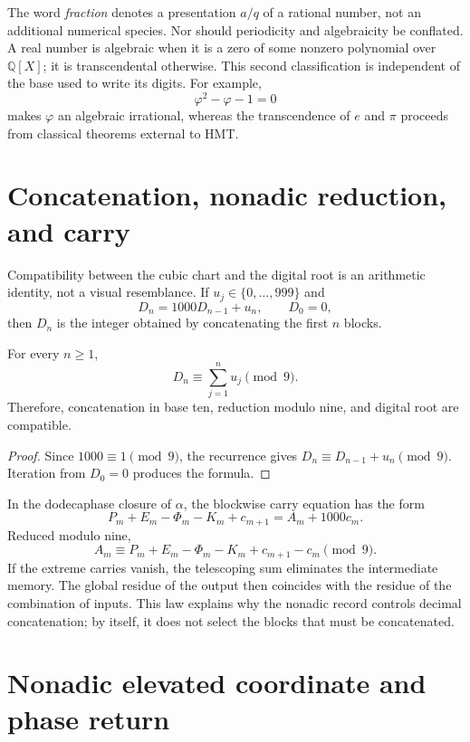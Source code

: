 The word \emph{fraction} denotes a presentation \(a/q\) of a rational
number, not an additional numerical species. Nor should periodicity and
algebraicity be conflated. A real number is algebraic when it is a zero of
some nonzero polynomial over \(\mathbb Q[X]\); it is transcendental otherwise. This
second classification is independent of the base used to write its digits.
For example,
\[
 \varphi^2-\varphi-1=0
\]
makes \(\varphi\) an algebraic irrational, whereas the transcendence
of \(e\) and \(\pi\) proceeds from classical theorems external to HMT\@.

\section{Concatenation, nonadic reduction, and carry}

Compatibility between the cubic chart and the digital root is an arithmetic
identity, not a visual resemblance. If \(u_j\in\{0,\ldots,999\}\) and
\[
 D_n=1000D_{n-1}+u_n,
 \qquad D_0=0,
\]
then \(D_n\) is the integer obtained by concatenating the first \(n\)
blocks.

\begin{theorem}
\label{thm:checksum-nonadico-base-mil}
For every \(n\geq1\),
\[
 D_n\equiv\sum_{j=1}^n u_j\pmod9.
\]
Therefore, concatenation in base ten, reduction modulo nine, and digital root are compatible.
\end{theorem}

\begin{proof}
Since \(1000\equiv1\pmod9\), the recurrence gives
\(D_n\equiv D_{n-1}+u_n\pmod9\). Iteration from \(D_0=0\) produces the
formula.
\end{proof}

In the dodecaphase closure of \(\alpha\), the blockwise carry equation
has the form
\[
 P_m+E_m-\Phi_m-K_m+c_{m+1}=A_m+1000c_m.
\]
Reduced modulo nine,
\[
 A_m\equiv
 P_m+E_m-\Phi_m-K_m+c_{m+1}-c_m
 \pmod9.
\]
If the extreme carries vanish, the telescoping sum eliminates the intermediate
memory. The global residue of the output then coincides with the residue
of the combination of inputs. This law explains why the nonadic record
controls decimal concatenation; by itself, it does not select the blocks that
must be concatenated.

\section{Nonadic elevated coordinate and phase return}

